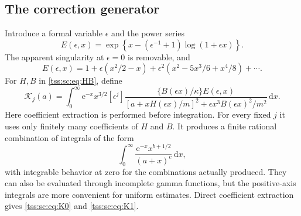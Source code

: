 \documentclass[11pt]{article}
\theoremstyle{remark}\newtheorem{remark}[theorem]{Remark}
\theoremstyle{definition}\newtheorem{definition}[theorem]{Definition}
\newcommand{\dd}{\mathrm d}
\newcommand{\e}{\mathrm e}
\newcommand{\Kc}{\mathcal K}
\begin{document}
\subsection{The correction generator}
Introduce a formal variable $\epsilon$ and the power series
\begin{equation}\label{tss:sc:eq:E}
 E(\epsilon,x)=\exp\left\{x-(\epsilon^{-1}+1)\log(1+\epsilon x)\right\}.
\end{equation}
The apparent singularity at $\epsilon=0$ is removable, and
\[
 E(\epsilon,x)=1+\epsilon(x^2/2-x)
  +\epsilon^2(x^2-5x^3/6+x^4/8)+\cdots.
\]
For $H,B$ in \eqref{tss:sc:eq:HB}, define
\begin{equation}\label{tss:sc:eq:generator}
 \boxed{\displaystyle
 \Kc_j(a)=\int_0^\infty \e^{-x}x^{3/2}
 [\epsilon^j]\frac{\{B(\epsilon x)/\kappa\}E(\epsilon,x)}
 {[a+xH(\epsilon x)/m]^2+\epsilon x^3B(\epsilon x)^2/m^2}\,\dd x.}
\end{equation}
Here coefficient extraction is performed before integration. For every fixed $j$ it uses only finitely many coefficients of $H$ and $B$. It produces a finite rational combination of integrals of the form
\begin{equation}\label{tss:sc:eq:elementarykernels}
 \int_0^\infty \frac{\e^{-x}x^{b+1/2}}{(a+x)^c}\,\dd x,
\end{equation}
with integrable behavior at zero for the combinations actually produced. They can also be evaluated through incomplete gamma functions, but the positive-axis integrals are more convenient for uniform estimates. Direct coefficient extraction gives \eqref{tss:sc:eq:K0} and \eqref{tss:sc:eq:K1}.
\end{document}
